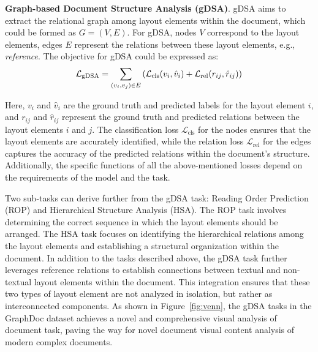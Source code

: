 

\textbf{Graph-based Document Structure Analysis (gDSA)}. gDSA aims to extract the relational graph among layout elements within the document, which could be formed as $G=(V, E)$. For gDSA, nodes $V$ correspond to the layout elements, edges $E$ represent the relations between these layout elements, e.g., \textit{reference}. The objective for gDSA could be expressed as:
\vspace{ -3px}
\begin{equation}
    \mathcal{L}_{\text{gDSA}} = \sum_{(v_i, v_j) \in E} \left( \mathcal{L}_{\text{cls}}(v_i, \hat{v}_i) + \mathcal{L}_{\text{rel}}(r_{ij}, \hat{r}_{ij}) \right)
\vspace{ -10px}
\end{equation}

Here, $ v_i $ and $ \hat{v}_i $ are the ground truth and predicted labels for the layout element $ i $, and $ r_{ij} $ and $ \hat{r}_{ij} $ represent the ground truth and predicted relations between the layout elements $ i $ and $ j $. The classification loss $\mathcal{L}_{\text{cls}}$ for the nodes ensures that the layout elements are accurately identified, while the relation loss $\mathcal{L}_{\text{rel}}$ for the edges captures the accuracy of the predicted relations within the document's structure. Additionally, the specific functions of all the above-mentioned losses depend on the requirements of the model and the task.

Two sub-tasks can derive further from the gDSA task: Reading Order Prediction (ROP) and Hierarchical Structure Analysis (HSA). The ROP task involves determining the correct sequence in which the layout elements should be arranged. The HSA task focuses on identifying the hierarchical relations among the layout elements and establishing a structural organization within the document. In addition to the tasks described above, the gDSA task further leverages reference relations to establish connections between textual and non-textual layout elements within the document. This integration ensures that these two types of layout element are not analyzed in isolation, but rather as interconnected components. As shown in Figure~\ref{fig:venn}, the gDSA tasks in the GraphDoc dataset achieves a novel and comprehensive visual analysis of document task, paving the way for novel document visual content analysis of modern complex documents.


